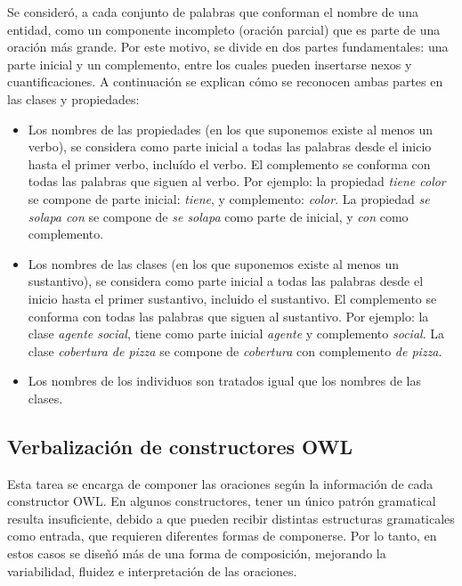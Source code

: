 Se consideró, a cada conjunto de palabras que conforman el nombre de una entidad, como un componente incompleto (oración parcial) que es parte de una oración más grande. Por este motivo, se divide en dos partes fundamentales: una parte inicial y un complemento, entre los cuales pueden insertarse nexos y cuantificaciones. A continuación se explican cómo se reconocen ambas partes en las clases y propiedades:
\begin{itemize}
    \item Los nombres de las propiedades (en los que suponemos existe al menos un verbo), se considera como parte inicial a todas las palabras desde el inicio hasta el primer verbo, incluído el verbo. El complemento se conforma con todas las palabras que siguen al verbo. Por ejemplo: la propiedad \emph{tiene color} se compone de parte inicial: \emph{tiene}, y complemento: \emph{color}. La propiedad \emph{se solapa con} se compone de \emph{se solapa} como parte de inicial, y \emph{con} como complemento.
    \item Los nombres de las clases (en los que suponemos existe al menos un sustantivo), se considera como parte inicial a todas las palabras desde el inicio hasta el primer sustantivo, incluido el sustantivo. El complemento se conforma con todas las palabras que siguen al sustantivo. Por ejemplo: la clase \emph{agente social}, tiene como parte inicial \emph{agente} y complemento \emph{social}. La clase \emph{cobertura de pizza} se compone de \emph{cobertura} con complemento \emph{de pizza}.
    \item Los nombres de los individuos son tratados igual que los nombres de las clases.
\end{itemize}


\subsection{Verbalización de constructores OWL}
\label{sec:verbalizacion_constructores}
Esta tarea se encarga de componer las oraciones según la información de cada constructor OWL.
En algunos constructores, tener un único patrón gramatical resulta insuficiente, debido a que pueden recibir distintas estructuras gramaticales como entrada, que requieren diferentes formas de componerse. Por lo tanto, en estos casos se diseñó más de una forma de composición, mejorando la variabilidad, fluidez e interpretación de las oraciones. 

